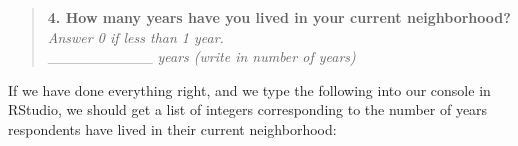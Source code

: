 \documentclass[]{article}
\newenvironment{Shaded}{\begin{snugshade}}{\end{snugshade}}
\newcommand{\NormalTok}[1]{{#1}}
\begin{document}
\begin{quote}
\textbf{4. How many years have you lived in your current neighborhood?}
\emph{Answer 0 if less than 1 year.}\\
\_\_\_\_\_\_\_\_\_\_ \emph{years (write in number of years)}
\end{quote}

If we have done everything right, and we type the following into our
console in RStudio, we should get a list of integers corresponding to
the number of years respondents have lived in their current
neighborhood:

\begin{Shaded}
\end{Shaded}
\end{document}
